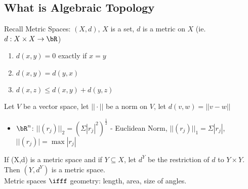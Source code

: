 
\subsection{What is Algebraic Topology}


Recall Metric Spaces: $(X, d)$, $X$ is a set, $d$ is a metric on $X$ (ie. $d: X \times X \to \bR$)
\begin{enumerate}
    \item $d(x,y)=0$ exactly if $x=y$
    \item $d(x,y) = d(y,x)$
    \item $d(x,z) \le d(x,y) + d(y,z)$ 
\end{enumerate}

\noindent
Let $V$ be a vector space, let $|| \cdot ||$ be a norm on $V$, let $d(v,w) = ||v-w||$ 
\begin{itemize}
    \item $\bR^n$: $||(r_j)||_2 = (\Sigma |r_j|^2)^{\frac{1}{2}}$ - Euclidean Norm, $||(r_j)||_1 = \Sigma |r_j|$, $||(r_j)| = \max {|r_j|}$
\end{itemize}

\noindent
If (X,d) is a metric space and if $Y \subseteq X$, let $d^Y$ be the restriction of $d$ to $Y \times Y$. Then $(Y, d^Y)$ is a metric space. \\

\noindent
Metric spaces $\ifff$ geometry: length, area, size of angles. \\


